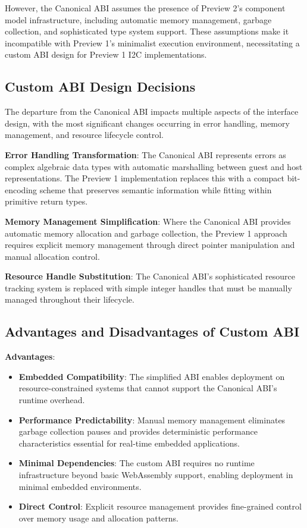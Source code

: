 However, the Canonical ABI assumes the presence of Preview 2's component model infrastructure, including automatic memory management, garbage collection, and sophisticated type system support. These assumptions make it incompatible with Preview 1's minimalist execution environment, necessitating a custom ABI design for Preview 1 I2C implementations.

\subsection{Custom ABI Design Decisions}

The departure from the Canonical ABI impacts multiple aspects of the interface design, with the most significant changes occurring in error handling, memory management, and resource lifecycle control.

\textbf{Error Handling Transformation}: The Canonical ABI represents errors as complex algebraic data types with automatic marshalling between guest and host representations. The Preview 1 implementation replaces this with a compact bit-encoding scheme that preserves semantic information while fitting within primitive return types.

\textbf{Memory Management Simplification}: Where the Canonical ABI provides automatic memory allocation and garbage collection, the Preview 1 approach requires explicit memory management through direct pointer manipulation and manual allocation control.

\textbf{Resource Handle Substitution}: The Canonical ABI's sophisticated resource tracking system is replaced with simple integer handles that must be manually managed throughout their lifecycle.

\subsection{Advantages and Disadvantages of Custom ABI}

\textbf{Advantages}:
\begin{itemize}
    \item \textbf{Embedded Compatibility}: The simplified ABI enables deployment on resource-constrained systems that cannot support the Canonical ABI's runtime overhead.
    \item \textbf{Performance Predictability}: Manual memory management eliminates garbage collection pauses and provides deterministic performance characteristics essential for real-time embedded applications.
    \item \textbf{Minimal Dependencies}: The custom ABI requires no runtime infrastructure beyond basic WebAssembly support, enabling deployment in minimal embedded environments.
    \item \textbf{Direct Control}: Explicit resource management provides fine-grained control over memory usage and allocation patterns.
\end{itemize}

